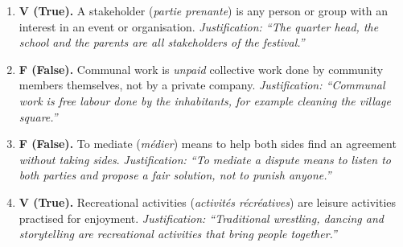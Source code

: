 \documentclass[11pt]{article}
\newcommand{\cle}[1]{{\popxbold\color{popdark}#1}}
\begin{document}
\begin{corrige}

\begin{enumerate}
\item \textbf{V (True).} A \cle{stakeholder} (\emph{partie prenante}) is any person or group with an interest in an event or organisation. \emph{Justification: ``The quarter head, the school and the parents are all stakeholders of the festival.''}

\item \textbf{F (False).} \cle{Communal work} is \emph{unpaid} collective work done by community members themselves, not by a private company. \emph{Justification: ``Communal work is free labour done by the inhabitants, for example cleaning the village square.''}

\item \textbf{F (False).} To \cle{mediate} (\emph{médier}) means to help both sides find an agreement \emph{without taking sides}. \emph{Justification: ``To mediate a dispute means to listen to both parties and propose a fair solution, not to punish anyone.''}

\item \textbf{V (True).} \cle{Recreational activities} (\emph{activités récréatives}) are leisure activities practised for enjoyment. \emph{Justification: ``Traditional wrestling, dancing and storytelling are recreational activities that bring people together.''}
\end{enumerate}
\end{corrige}
\end{document}

